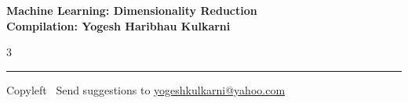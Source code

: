 \documentclass[8pt,landscape]{article}
\begin{document}
\footnotesize


\begin{center}
\Large{\textbf{Machine Learning: Dimensionality Reduction\\ Compilation: Yogesh Haribhau Kulkarni}}
\end{center}

\begin{multicols}{3}

\end{multicols}

\rule{\linewidth}{0.25pt}
\scriptsize
Copyleft \textcopyleft\  Send suggestions to
\href{http://www.yogeshkulkarni.com}{yogeshkulkarni@yahoo.com}
\end{document}
